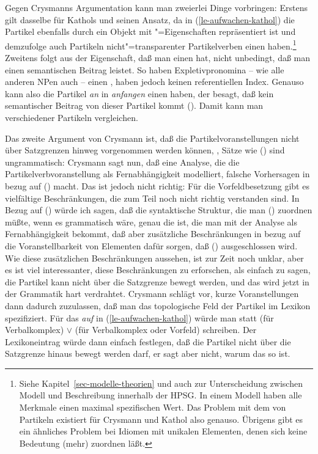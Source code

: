 Gegen Crysmanns Argumentation kann man zweierlei Dinge vorbringen: Erstens
gilt dasselbe für Kathols und seinen Ansatz, da in (\ref{le-aufwachen-kathol})
die Partikel ebenfalls durch ein Objekt mit "=Eigenschaften repräsentiert
ist und demzufolge auch Partikeln nicht"=transparenter Partikelverben einen \contw haben.\footnote{
Siehe Kapitel~\ref{sec-modelle-theorien} und auch 
zur Unterscheidung zwischen Modell und Beschreibung innerhalb der HPSG. In einem
Modell haben alle Merkmale einen maximal spezifischen Wert. Das Problem mit dem
\contw von Partikeln existiert für Crysmann und Kathol also genauso. Übrigens gibt
es ein ähnliches Problem bei Idiomen mit unikalen Elementen, denen sich keine
Bedeutung (mehr) zuordnen läßt.%
} 
Zweitens folgt aus der
Eigenschaft, daß man einen \contw hat, nicht unbedingt, daß man einen semantischen
Beitrag leistet. So haben Expletivpronomina 
-- wie alle anderen NPen auch -- einen \contw, 
haben jedoch keinen referentiellen Index. Genauso kann also die
Partikel \emph{an} in \emph{anfangen} einen \contw haben, der besagt, daß kein
semantischer Beitrag von dieser Partikel kommt (\zb {}).
Damit kann man \contwe verschiedener Partikeln vergleichen.

Das zweite Argument von Crysmann ist, daß die Partikelvoranstellungen
nicht über Satzgrenzen hinweg vorgenommen werden können, \dash, Sätze wie
() sind ungrammatisch:
\z
{}
Crysmann sagt nun, daß eine Analyse, die die Partikelverbvoranstellung als
Fernabhängigkeit modelliert, falsche Vorhersagen in bezug auf () macht.
Das ist jedoch nicht richtig: Für die Vorfeldbesetzung gibt es vielfältige
Beschränkungen, die zum Teil noch nicht richtig verstanden sind. In Bezug auf ()
würde ich sagen, daß die syntaktische Struktur, die man () zuordnen
müßte, wenn es grammatisch wäre, genau die ist, die man mit der Analyse als
Fernabhängigkeit bekommt, daß aber zusätzliche Beschränkungen in bezug auf die Voranstellbarkeit
von Elementen dafür sorgen, daß () ausgeschlossen wird.
Wie diese zusätzlichen Beschränkungen aussehen, ist zur Zeit noch unklar, aber
es ist viel interessanter, diese Beschränkungen zu erforschen, als einfach zu sagen,
die Partikel kann nicht über die Satzgrenze bewegt werden, und das wird jetzt in
der Grammatik hart verdrahtet. Crysmann schlägt vor, kurze Voranstellungen
dann dadurch zuzulassen, daß man das topologische Feld der Partikel im Lexikon
spezifiziert. Für das \emph{auf} in (\ref{le-aufwachen-kathol})
würde man statt  (für Verbalkomplex)
 $\vee$  (für Verbalkomplex oder Vorfeld) schreiben.
Der Lexikoneintrag würde dann einfach festlegen, daß die Partikel nicht über die Satzgrenze 
hinaus bewegt werden darf, er sagt aber nicht, warum das so ist.

